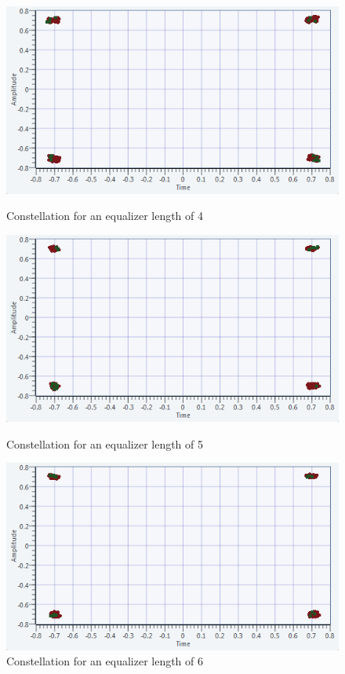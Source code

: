 \documentclass[frenchb, oneside, headings=normal]{scrartcl}
\begin{document}
\begin{figure}[ht]
\begin{minipage}[b]{0.48\linewidth}
    \end{minipage}\hfill
    \begin{minipage}[b]{0.48\linewidth}
         \centering \includegraphics[scale=0.6]{img/ISI-4.png}
        \caption{Constellation for an equalizer length of 4}
        \label{fig4}
    \end{minipage}
    
    \begin{minipage}[b]{0.48\linewidth}
        \centering \includegraphics[scale=0.6]{img/ISI-5.png}
    \caption{Constellation for an equalizer length of 5}
    \label{fig5}
    
    \end{minipage}\hfill
    \begin{minipage}[b]{0.48\linewidth}
         \centering \includegraphics[scale=0.6]{img/ISI-6.png}
        \caption{Constellation for an equalizer length of 6}
        \label{fig6}
    \end{minipage}
\end{figure}
\end{document}
